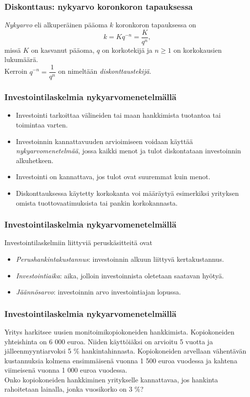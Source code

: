 \documentclass[]{beamer}
\newcommand{\pblock}{\\ \vspace{0.5cm}\pause}
\begin{document}
\begin{frame}
    \frametitle{Diskonttaus: nykyarvo koronkoron tapauksessa}
    \pause
    \begin{block}{}
        \emph{Nykyarvo} eli alkuperäinen pääoma $k$ koronkoron tapauksessa on
        \[
            k = Kq^{-n} = \frac{K}{q^n},
        \]
        missä $K$ on kasvanut pääoma, $q$ on korkotekijä ja $n \geq 1$ on korkokausien lukumäärä.
        \pblock
        Kerroin $q^{-n} = \dfrac{1}{q^n}$ on nimeltään \emph{diskonttaustekijä}.
    \end{block}
\end{frame}

\begin{frame}
    \frametitle{Investointilaskelmia nykyarvomenetelmällä}
    \begin{itemize}
        \item {Investointi} tarkoittaa välineiden tai maan hankkimista tuotantoa tai toimintaa varten. \pause
        \item Investoinnin kannattavuuden arvioimiseen voidaan käyttää \emph{nykyarvomenetelmää}, jossa kaikki menot ja tulot diskontataan investoinnin alkuhetkeen.  \pause
        \item Investointi on kannattava, jos tulot ovat suuremmat kuin menot. \pause
        \item Diskonttauksessa käytetty korkokanta voi määräytyä esimerkiksi yrityksen omista tuottovaatimuksista tai pankin korkokannasta.
    \end{itemize}
\end{frame}

\begin{frame}
    \frametitle{Investointilaskelmia nykyarvomenetelmällä}
    Investointilaskelmiin liittyviä peruskäsitteitä ovat \pause
    \begin{itemize}
        \item \emph{Perushankintakustannus}: investoinnin alkuun liittyvä kertakustannus. \pause
        \item \emph{Investointiaika}: aika, jolloin investoinnista oletetaan saatavan hyötyä. \pause
        \item \emph{Jäännösarvo}: investoinnin arvo investointiajan lopussa.
    \end{itemize}
\end{frame}

\begin{frame}
\frametitle{Investointilaskelmia nykyarvomenetelmällä}
    \begin{esim}
    Yritys harkitsee uusien monitoimikopiokoneiden hankkimista.
    Kopiokoneiden yhteishinta on 6 000 euroa. Niiden käyttöiäksi on arvioitu 5 vuotta ja jälleenmyyntiarvoksi 5 \% hankintahinnasta.
    Kopiokoneiden arvellaan vähentävän kustannuksia kolmena ensimmäisenä vuonna 1 500 euroa vuodessa ja kahtena viimeisenä vuonna 1 000 euroa vuodessa.
    \pblock
    Onko kopiokoneiden hankkiminen yritykselle kannattavaa, jos hankinta rahoitetaan lainalla, jonka vuosikorko on 3 \%?
    \end{esim}
\end{frame}
\end{document}
